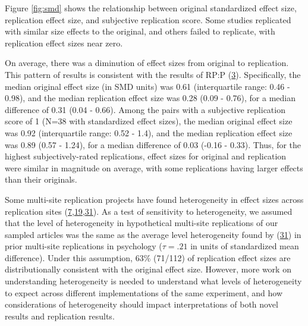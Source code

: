 \documentclass[
  english,
  a4paper,
]{article}
\begin{document}
Figure \ref{fig:smd} shows the relationship between original standardized effect size, replication effect size, and subjective replication score. Some studies replicated with similar size effects to the original, and others failed to replicate, with replication effect sizes near zero.

On average, there was a diminution of effect sizes from original to replication. This pattern of results is consistent with the results of RP:P (\protect\hyperlink{ref-openscienceconsortium2015}{3}). Specifically, the median original effect size (in SMD units) was 0.61 (interquartile range: 0.46 - 0.98), and the median replication effect size was 0.28 (0.09 - 0.76), for a median difference of 0.31 (0.04 - 0.66). Among the pairs with a subjective replication score of 1 (N=38 with standardized effect sizes), the median original effect size was 0.92 (interquartile range: 0.52 - 1.4), and the median replication effect size was 0.89 (0.57 - 1.24), for a median difference of 0.03 (-0.16 - 0.33). Thus, for the highest subjectively-rated replications, effect sizes for original and replication were similar in magnitude on average, with some replications having larger effects than their originals.

Some multi-site replication projects have found heterogeneity in effect sizes across replication sites (\protect\hyperlink{ref-klein2018}{7},\protect\hyperlink{ref-ebersole2020}{19},\protect\hyperlink{ref-olsson2020}{31}). As a test of sensitivity to heterogeneity, we assumed that the level of heterogeneity in hypothetical multi-site replications of our sampled articles was the same as the average level heterogeneity found by (\protect\hyperlink{ref-olsson2020}{31}) in prior multi-site replications in psychology (\(\tau=.21\) in units of standardized mean difference). Under this assumption, 63\% (71/112) of replication effect sizes are distributionally consistent with the original effect size. However, more work on understanding heterogeneity is needed to understand what levels of heterogeneity to expect across different implementations of the same experiment, and how considerations of heterogeneity should impact interpretations of both novel results and replication results.
\end{document}
